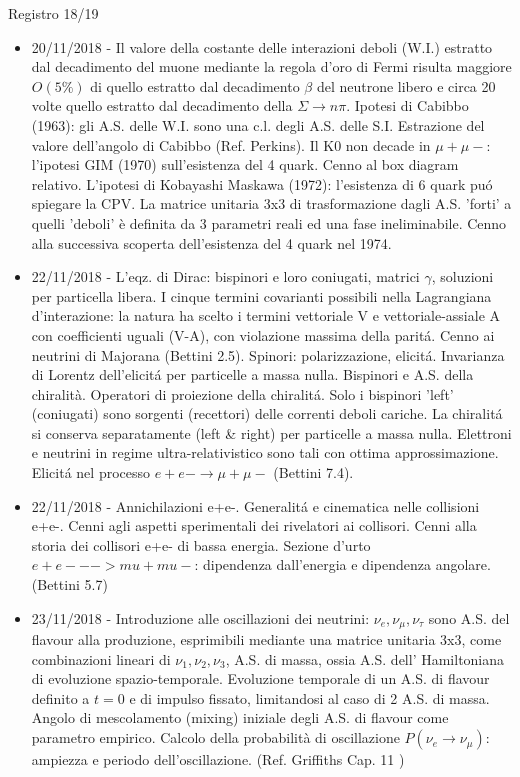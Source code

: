 \begin{frame}[allowframebreaks]{Registro 18/19}
\begin{itemize}
\item 20/11/2018 - Il valore della costante delle interazioni deboli (W.I.) estratto dal decadimento del muone mediante la regola d'oro di Fermi risulta maggiore $O(5\%)$ di quello estratto dal decadimento $\beta$ del neutrone libero e circa 20 volte quello estratto dal decadimento della $\Sigma\to n\pi$. Ipotesi di Cabibbo (1963): gli A.S. delle W.I. sono una c.l. degli A.S. delle S.I. Estrazione del valore dell'angolo di Cabibbo (Ref. Perkins). Il K0 non decade in $\mu+\mu-$: l'ipotesi GIM (1970) sull'esistenza del 4 quark. Cenno al box diagram relativo. L'ipotesi di Kobayashi Maskawa (1972): l'esistenza di 6 quark pu\'o spiegare la CPV. La matrice unitaria 3x3 di trasformazione dagli A.S. 'forti' a quelli 'deboli' è definita da 3 parametri reali ed una fase ineliminabile. Cenno alla successiva scoperta dell'esistenza del 4 quark nel 1974.
\item 22/11/2018 - L'eqz. di Dirac: bispinori e loro coniugati, matrici $\gamma$, soluzioni per particella libera. I cinque termini covarianti possibili nella Lagrangiana d'interazione: la natura ha scelto i termini vettoriale V e vettoriale-assiale A con coefficienti uguali (V-A), con violazione massima della parit\'a. Cenno ai neutrini di Majorana (Bettini 2.5). Spinori: polarizzazione, elicit\'a. Invarianza di Lorentz dell'elicit\'a per particelle a massa nulla. Bispinori e A.S. della chiralità. Operatori di proiezione della chiralit\'a. Solo i bispinori 'left' (coniugati) sono sorgenti (recettori) delle correnti deboli cariche. La chiralit\'a si conserva separatamente (left \& right) per particelle a massa nulla. Elettroni e neutrini in regime ultra-relativistico sono tali con ottima approssimazione. Elicit\'a nel processo $e+e-\to\mu+\mu-$ (Bettini 7.4).
\item 22/11/2018 - Annichilazioni e+e-. Generalit\'a e cinematica nelle collisioni e+e-. Cenni agli aspetti sperimentali dei rivelatori ai collisori. Cenni alla storia dei collisori e+e- di bassa energia. Sezione d'urto $e+e- --> mu+mu-$: dipendenza dall'energia e dipendenza angolare. (Bettini 5.7)
\item 23/11/2018 - Introduzione alle oscillazioni dei neutrini: $\nu_e, \nu_{\mu}, \nu_{\tau}$ sono A.S. del flavour alla produzione, esprimibili mediante una matrice unitaria 3x3, come combinazioni lineari di $\nu_1, \nu_2, \nu_3$, A.S. di massa, ossia A.S. dell' Hamiltoniana di evoluzione spazio-temporale. Evoluzione temporale di un A.S. di flavour definito a $t=0$ e di impulso fissato, limitandosi al caso di 2 A.S. di massa. Angolo di mescolamento (mixing) iniziale degli A.S. di flavour come parametro empirico. Calcolo della probabilità di oscillazione $P(\nu_e \to \nu_{\mu})$: ampiezza e periodo dell'oscillazione. (Ref. Griffiths Cap. 11 )

\end{itemize}
\end{frame}
